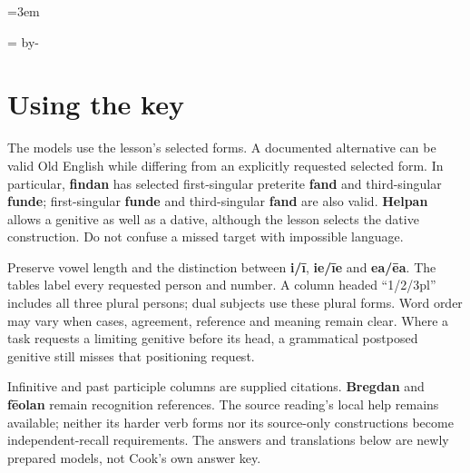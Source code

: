 \newcommand{\runningtitle}{Unit 4. Answer key}

\emergencystretch=3em
\newcommand{\itempara}[2]{\par\addvspace{3pt}\noindent\hangindent=1.8em\hangafter=1\makebox[1.8em][l]{#1.}#2\par}
\newcommand{\reserve}[1]{\par\penalty-100\begingroup\dimen0=\pagegoal\advance\dimen0 by-\pagetotal\ifdim\dimen0<#1\newpage\fi\endgroup}

\raggedright
{}

\reserve{7\baselineskip}
\section*{Using the key}

The models use the lesson's selected forms. A documented alternative can be valid Old English while differing from an explicitly requested selected form. In particular, \textbf{findan} has selected first-singular preterite \textbf{fand} and third-singular \textbf{funde}; first-singular \textbf{funde} and third-singular \textbf{fand} are also valid. \textbf{Helpan} allows a genitive as well as a dative, although the lesson selects the dative construction. Do not confuse a missed target with impossible language.

Preserve vowel length and the distinction between \textbf{i/\allowbreak{}ī}, \textbf{ie/\allowbreak{}īe} and \textbf{ea/\allowbreak{}ēa}. The tables label every requested person and number. A column headed “1/\allowbreak{}2/\allowbreak{}3pl” includes all three plural persons; dual subjects use these plural forms. Word order may vary when cases, agreement, reference and meaning remain clear. Where a task requests a limiting genitive before its head, a grammatical postposed genitive still misses that positioning request.

Infinitive and past participle columns are supplied citations. \textbf{Bregdan} and \textbf{fēolan} remain recognition references. The source reading's local help remains available; neither its harder verb forms nor its source-only constructions become independent-recall requirements. The answers and translations below are newly prepared models, not Cook's own answer key.

